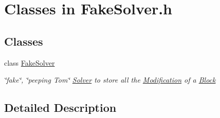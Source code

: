\hypertarget{group___fake_solver___c_l_a_s_s_e_s}{}\section{Classes in Fake\+Solver.\+h}
\label{group___fake_solver___c_l_a_s_s_e_s}
\subsection*{Classes}
\begin{DoxyCompactItemize}
\item 
class \mbox{\hyperlink{class_s_m_spp__di__unipi__it_1_1_fake_solver}{Fake\+Solver}}
\begin{DoxyCompactList}\small\item\em \char`\"{}fake\char`\"{}, \char`\"{}peeping Tom\char`\"{} \mbox{\hyperlink{class_s_m_spp__di__unipi__it_1_1_solver}{Solver}} to store all the \mbox{\hyperlink{class_s_m_spp__di__unipi__it_1_1_modification}{Modification}} of a \mbox{\hyperlink{class_s_m_spp__di__unipi__it_1_1_block}{Block}} \end{DoxyCompactList}\end{DoxyCompactItemize}


\subsection{Detailed Description}
